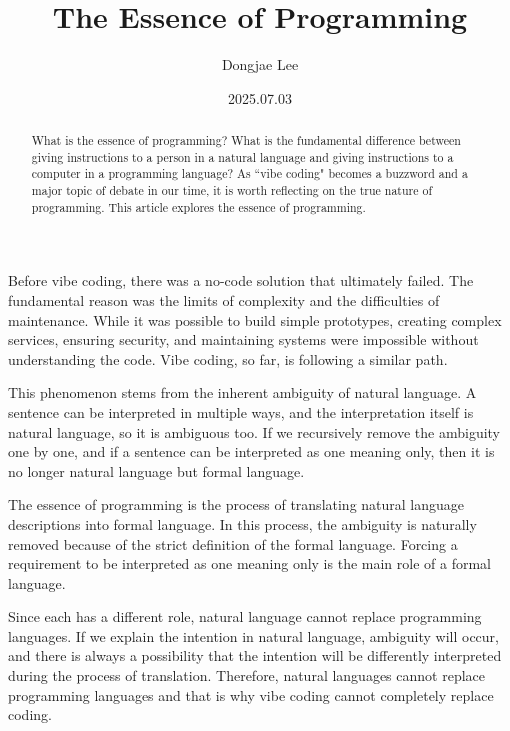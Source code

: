 \documentclass[11pt, oneside]{article}
\title{The Essence of Programming}
\author{Dongjae Lee}
\date{2025.07.03}
\begin{document}
\maketitle

\begin{abstract}
	What is the essence of programming? What is the fundamental difference between giving instructions to a person in a natural language and giving instructions to a computer in a programming language?
	As ``vibe coding" becomes a buzzword and a major topic of debate in our time, it is worth reflecting on the true nature of programming.
	This article explores the essence of programming.
\end{abstract}

Before vibe coding, there was a no-code solution that ultimately failed.
The fundamental reason was the limits of complexity and the difficulties of maintenance.
While it was possible to build simple prototypes, creating complex services, ensuring security, and maintaining systems were impossible without understanding the code.
Vibe coding, so far, is following a similar path.

This phenomenon stems from the inherent ambiguity of natural language.
A sentence can be interpreted in multiple ways, and the interpretation itself is natural language, so it is ambiguous too.
If we recursively remove the ambiguity one by one, and if a sentence can be interpreted as one meaning only, then it is no longer natural language but formal language.

The essence of programming is the process of translating natural language descriptions into formal language.
In this process, the ambiguity is naturally removed because of the strict definition of the formal language.
Forcing a requirement to be interpreted as one meaning only is the main role of a formal language.

Since each has a different role, natural language cannot replace programming languages.
If we explain the intention in natural language, ambiguity will occur, and there is always a possibility that the intention will be differently interpreted during the process of translation.
Therefore, natural languages cannot replace programming languages and that is why vibe coding cannot completely replace coding.
\end{document}
